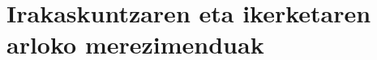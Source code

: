 \documentclass[
 10pt,%
 compress,%
 t,       %
 xcolor=svgnames
]{beamer}
\theoremstyle{definition} \newtheorem{definicion}{Definicion}[section]
\theoremstyle{propiedades} \newtheorem{propiedades}{Propiedades}[section]
\begin{document}
%
%
%
%
%



\section[Irakaskuntzaren eta ikerketaren arloko merezimenduak]{Irakaskuntzaren eta ikerketaren arloko merezimenduak}
\end{document}
